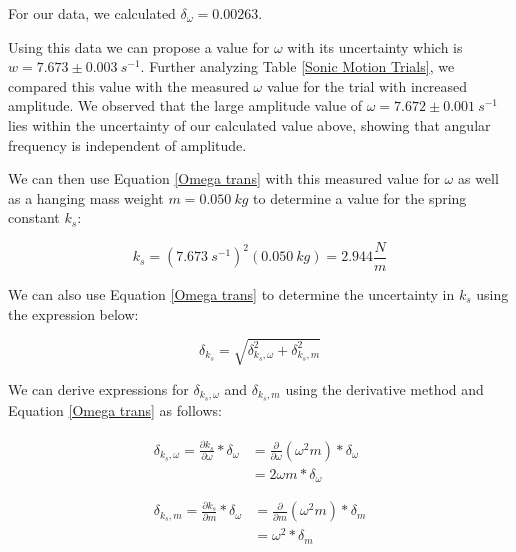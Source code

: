 \documentclass[12pt]{article}
\begin{document}
\noindent For our data, we calculated $\delta_\omega=0.00263$.

Using this data we can propose a value for $\omega$ with its uncertainty which is $w = 7.673\pm0.003\ s^{-1}$. Further analyzing Table \ref{Sonic Motion Trials}, we compared this value with the measured $\omega$ value for the trial with increased amplitude. We observed that the large amplitude value of $\omega=7.672\pm0.001\ s^{-1}$ lies within the uncertainty of our calculated value above, showing that angular frequency is independent of amplitude.

We can then use Equation \ref{Omega trans} with this measured value for $\omega$ as well as a hanging mass weight $m=0.050\ kg$ to determine a value for the spring constant $k_s$:

\begin{equation*}
    k_s= (7.673\ s^{-1})^2(0.050\ kg) = 2.944 \frac{N}{m}
\end{equation*}

\noindent We can also use Equation \ref{Omega trans} to determine the uncertainty in $k_s$ using the expression below:

\begin{equation}
    \delta_{k_s}=\sqrt{\delta_{k_s,\omega}^2+\delta_{k_s,m}^2} \label{UNC in ks}
\end{equation}

We can derive expressions for $\delta_{k_s,\omega}$ and $\delta_{k_s,m}$ using the derivative method and Equation \ref{Omega trans} as follows:

\begin{align}
    \begin{split}
        \delta_{k_s,\omega}=\frac{\partial k_s}{\partial\omega}*\delta_\omega&=\frac{\partial}{\partial\omega}(\omega^2 m)*\delta_\omega \\
        &=2\omega m*\delta_\omega \label{ks due to omega}
    \end{split} \\ \nonumber \\
    \begin{split}
        \delta_{k_s,m}=\frac{\partial k_s}{\partial m}*\delta_\omega&=\frac{\partial}{\partial m}(\omega^2 m)*\delta_m \\
        &=\omega^2*\delta_m \label{ks due to m}
    \end{split}
\end{align}
\end{document}
